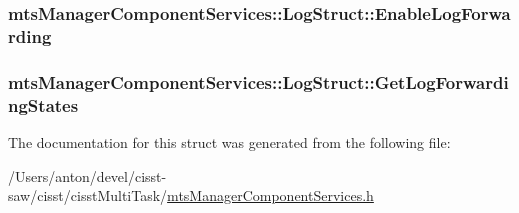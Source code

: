 \subsubsection[{Enable\+Log\+Forwarding}]{ mts\+Manager\+Component\+Services\+::\+Log\+Struct\+::\+Enable\+Log\+Forwarding}\label{structmts_manager_component_services_1_1_log_struct_aeb9d7421249c425d58f0cff939bb7c12}
\hypertarget{structmts_manager_component_services_1_1_log_struct_afc7c70d03ea7f0f532e7b9154329d71b}{}
\subsubsection[{Get\+Log\+Forwarding\+States}]{ mts\+Manager\+Component\+Services\+::\+Log\+Struct\+::\+Get\+Log\+Forwarding\+States}\label{structmts_manager_component_services_1_1_log_struct_afc7c70d03ea7f0f532e7b9154329d71b}


The documentation for this struct was generated from the following file\+:\begin{DoxyCompactItemize}
\item 
/\+Users/anton/devel/cisst-\/saw/cisst/cisst\+Multi\+Task/\hyperlink{mts_manager_component_services_8h}{mts\+Manager\+Component\+Services.\+h}\end{DoxyCompactItemize}
